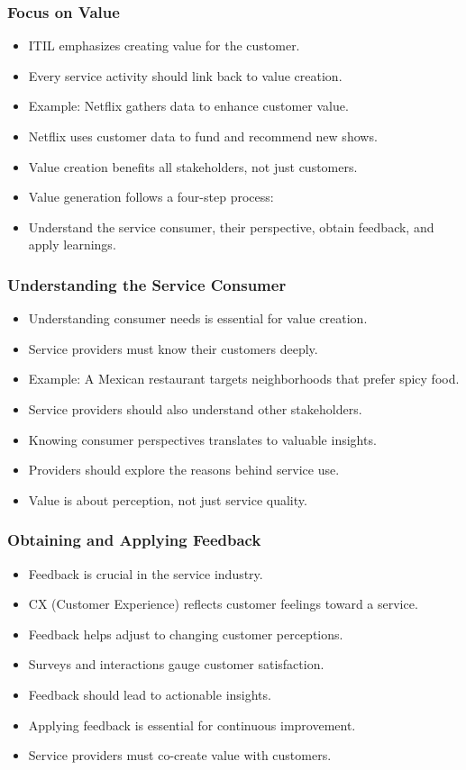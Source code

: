 \documentclass[aspectratio=169, table]{beamer}
\begin{document}
\begin{frame}
	\frametitle{Focus on Value}
	\begin{itemize}
		\item ITIL emphasizes creating value for the customer.
		\item Every service activity should link back to value creation.
		\item Example: Netflix gathers data to enhance customer value.
		\item Netflix uses customer data to fund and recommend new shows.
		\item Value creation benefits all stakeholders, not just customers.
		\item Value generation follows a four-step process:
		\item Understand the service consumer, their perspective, obtain feedback, and apply learnings.
	\end{itemize}
\end{frame}

\begin{frame}
	\frametitle{Understanding the Service Consumer}
	\begin{itemize}
		\item Understanding consumer needs is essential for value creation.
		\item Service providers must know their customers deeply.
		\item Example: A Mexican restaurant targets neighborhoods that prefer spicy food.
		\item Service providers should also understand other stakeholders.
		\item Knowing consumer perspectives translates to valuable insights.
		\item Providers should explore the reasons behind service use.
		\item Value is about perception, not just service quality.
	\end{itemize}
\end{frame}

\begin{frame}
	\frametitle{Obtaining and Applying Feedback}
	\begin{itemize}
		\item Feedback is crucial in the service industry.
		\item CX (Customer Experience) reflects customer feelings toward a service.
		\item Feedback helps adjust to changing customer perceptions.
		\item Surveys and interactions gauge customer satisfaction.
		\item Feedback should lead to actionable insights.
		\item Applying feedback is essential for continuous improvement.
		\item Service providers must co-create value with customers.
	\end{itemize}
\end{frame}
\end{document}
